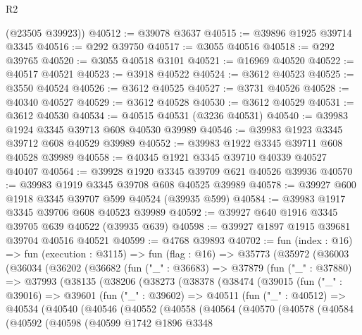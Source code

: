 \begin{lexlean}{R2}
\begin{coremodule}
      (@23505 @39923))
@40512 := @39078 @3637
@40515 := @39896 @1925 @39714 @3345
@40516 := @292 @39750
@40517 := @3055 @40516
@40518 := @292 @39765
@40520 := @3055 @40518 @3101
@40521 := @16969 @40520
@40522 := @40517 @40521
@40523 := @3918 @40522
@40524 := @3612 @40523
@40525 := @3550 @40524
@40526 := @3612 @40525
@40527 := @3731 @40526
@40528 := @40340 @40527
@40529 := @3612 @40528
@40530 := @3612 @40529
@40531 := @3612 @40530
@40534 := @40515 @40531 (@3236 @40531)
@40540 := @39983 @1924 @3345 @39713 @608 @40530 @39989
@40546 := @39983 @1923 @3345 @39712 @608 @40529 @39989
@40552 := @39983 @1922 @3345 @39711 @608 @40528 @39989
@40558 := @40345 @1921 @3345 @39710 @40339 @40527 @40407
@40564 := @39928 @1920 @3345 @39709 @621 @40526 @39936
@40570 := @39983 @1919 @3345 @39708 @608 @40525 @39989
@40578 := @39927 @600 @1918 @3345 @39707 @599 @40524 (@39935 @599)
@40584 := @39983 @1917 @3345 @39706 @608 @40523 @39989
@40592 := @39927 @640 @1916 @3345 @39705 @639 @40522 (@39935 @639)
@40598 := @39927 @1897 @1915 @39681 @39704 @40516 @40521
@40599 := @4768 @39893
@40702 := fun (index : @16) =>
  fun (execution : @3115) =>
  fun (flag : @16) =>
  @35773
    (@35972
      (@36003
        (@36034
          (@36202
            (@36682
              (fun ("_" : @36683) =>
              @37879
                (fun ("_" : @37880) =>
                @37993
                  (@38135
                    (@38206
                      (@38273
                        (@38378
                          (@38474
                            (@39015
                              (fun ("_" : @39016) =>
                              @39601
                                (fun ("_" : @39602) =>
                                @40511
                                  (fun ("_" : @40512) =>
                                  @40534
                                    (@40540
                                      (@40546
                                        (@40552
                                          (@40558
                                            (@40564
                                              (@40570
                                                (@40578
                                                  (@40584
                                                    (@40592
                                                      (@40598
                                                        (@40599
                                                          @1742
                                                          @1896
                                                          @3348

\end{coremodule}
\end{lexlean}
